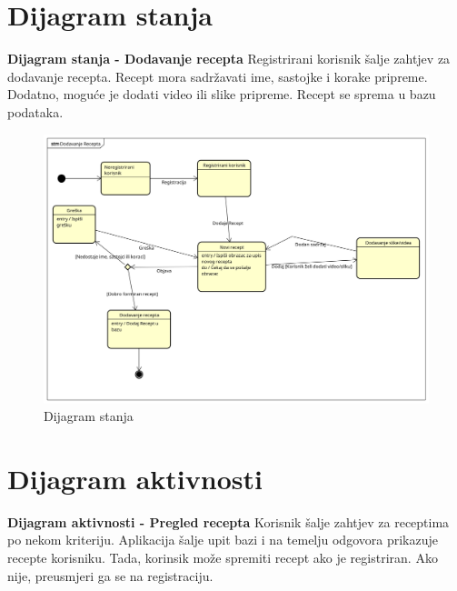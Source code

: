 \eject

\section{Dijagram stanja}


	\noindent
	\textbf{Dijagram stanja - Dodavanje recepta}\newline
		{Registrirani korisnik šalje zahtjev za dodavanje recepta. Recept mora sadržavati ime, sastojke i korake pripreme. Dodatno, moguće je dodati video ili slike pripreme. Recept se sprema u bazu podataka.}

	\begin{figure}[H]
		\includegraphics[scale= 0.4]{slike/DijagramStanja.png}
		\centering
		\caption{Dijagram stanja}
		\label{fig:Dijagram stanja}
	\end{figure} 
\eject

\section{Dijagram aktivnosti}

	\noindent
	\textbf{Dijagram aktivnosti - Pregled recepta}\newline
		{Korisnik šalje zahtjev za receptima po nekom kriteriju. Aplikacija šalje upit bazi i na temelju odgovora prikazuje recepte korisniku. Tada, korinsik može spremiti recept ako je registriran. Ako nije, preusmjeri ga se na registraciju.}

